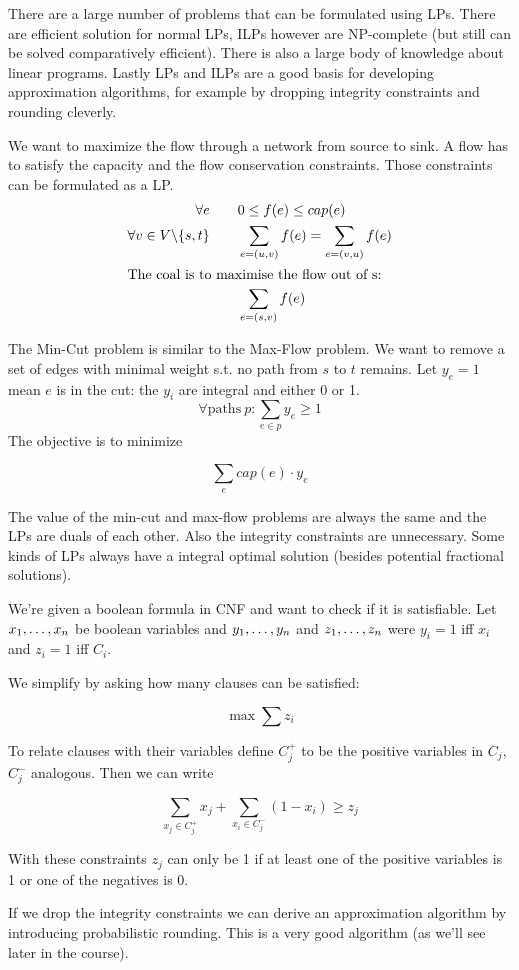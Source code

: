 \begin{itemize}
There are a large number of problems that can be formulated using LPs. There are efficient solution for normal LPs, ILPs however are NP-complete (but still can be solved comparatively efficient). There is also a large body of knowledge about linear programs. Lastly LPs and ILPs are a good basis for developing approximation algorithms, for example by dropping integrity constraints and rounding cleverly.

\begin{Ex} We want to maximize the flow through a network from source to sink. A flow has to satisfy the capacity and the flow conservation constraints. Those constraints can be formulated as a LP.
\begin{align*}
\forall e\qquad & 0\leq f(e)\leq cap(e)\\
\forall v\in V\backslash \{s,t\}\qquad & \sum_{e=(u,v)} f(e) = \sum_{e=(v,u)} f(e)\\
\intertext{The coal is to maximise the flow out of s:}
 &\sum_{e=(s,v)} f(e)
\end{align*}
\end{Ex}

\begin{Ex} The Min-Cut problem is similar to the Max-Flow problem. We want to remove a set of edges with minimal weight s.t. no path from $s$ to $t$ remains. Let $y_e=1$ mean $e$ is in the cut: the $y_i$ are integral and either 0 or 1.
\[\forall \mbox{paths}\ p: \sum_{e\in p} y_e \geq 1\]
The objective is to minimize 

\[\sum_e cap(e)\cdot y_e\]

The value of the min-cut and max-flow problems are always the same and the LPs are duals of each other. Also the integrity constraints are unnecessary. Some kinds of LPs always have a integral optimal solution (besides potential fractional solutions).
\end{Ex}

\begin{Ex}[Satisfiability] We're given a boolean formula in CNF and want to check if it is satisfiable. Let ${x}_1,\ldots,{x}_n$ be boolean variables and ${y}_1,\ldots,{y}_n$ and ${z}_1,\ldots,{z}_n$ were $y_i=1$ iff $x_i$ and $z_i=1$ iff $C_i$.

We simplify by asking how many clauses can be satisfied:

\[\max \sum z_i\]

To relate clauses with their variables define $C_j^+$ to be the positive variables in $C_j$, $C_j^-$ analogous. Then we can write 

\[\sum_{x_j\in C_j^+} x_j + \sum_{x_i \in C_j^-} (1-x_i) \geq z_j\]

With these constraints $z_j$ can only be 1 if at least one of the positive variables is 1 or one of the negatives is 0.

If we drop the integrity constraints we can derive an approximation algorithm by introducing probabilistic rounding. This is a very good algorithm (as we'll see later in the course).
\end{Ex}
\end{itemize}